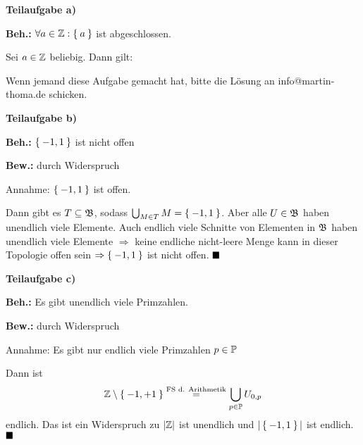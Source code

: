 \begin{solution}[\ref{ub1:aufg4}]
    \textbf{Teilaufgabe a)}

    \textbf{Beh.:}  $\forall a \in \mathbb{Z}: \Set{a}$ ist abgeschlossen.

    Sei $a \in \mathbb{Z}$ beliebig. Dann gilt:

    Wenn jemand diese Aufgabe gemacht hat, bitte die Lösung an info@martin-thoma.de
    schicken.%

    \textbf{Teilaufgabe b)}

    \textbf{Beh.:} $\Set{-1, 1}$ ist nicht offen

    \textbf{Bew.:} durch Widerspruch

    Annahme: $\Set{-1, 1}$ ist offen.

    Dann gibt es $T \subseteq \mathfrak{B}$, sodass $\bigcup_{M \in T} M = \Set{-1, 1}$.
    Aber alle $U \in \mathfrak{B}$ haben unendlich viele Elemente. Auch endlich
    viele Schnitte von Elementen in $\mathfrak{B}$ haben unendlich viele
    Elemente $\Rightarrow$ keine endliche nicht-leere Menge kann
    in dieser Topologie offen sein $\Rightarrow \Set{-1,1}$ ist
    nicht offen. $\qed$

    \textbf{Teilaufgabe c)}

    \textbf{Beh.:} Es gibt unendlich viele Primzahlen.

    \textbf{Bew.:} durch Widerspruch

    Annahme:  Es gibt nur endlich viele Primzahlen $p \in \mathbb{P}$

    Dann ist
    \[\mathbb{Z} \setminus \Set{-1, +1} \overset{\text{FS d. Arithmetik}}= \bigcup_{p \in \mathbb{P}} U_{0,p}\]
    endlich. Das ist ein Widerspruch zu $|\mathbb{Z}|$ ist unendlich und
    $|\Set{-1,1}|$ ist endlich. $\qed$
\end{solution}

